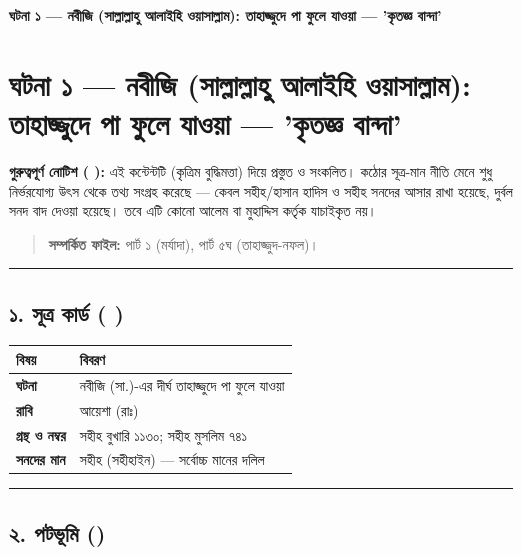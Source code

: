 

\begin{center}{\Large\bfseries\color{emerald} ঘটনা ১ — নবীজি (সাল্লাল্লাহু আলাইহি ওয়াসাল্লাম): তাহাজ্জুদে পা ফুলে যাওয়া — 'কৃতজ্ঞ বান্দা'}\end{center}
\vspace{1em}
\section*{ঘটনা ১ — নবীজি (সাল্লাল্লাহু আলাইহি ওয়াসাল্লাম): তাহাজ্জুদে পা ফুলে যাওয়া — 'কৃতজ্ঞ বান্দা'}

\begin{warnbox}
 \textbf{গুরুত্বপূর্ণ নোটিশ ( ):} এই কন্টেন্টটি  (কৃত্রিম বুদ্ধিমত্তা) দিয়ে প্রস্তুত ও সংকলিত।  কঠোর সূত্র-মান নীতি মেনে শুধু নির্ভরযোগ্য উৎস থেকে তথ্য সংগ্রহ করেছে — কেবল সহীহ/হাসান হাদিস ও সহীহ সনদের আসার রাখা হয়েছে, দুর্বল সনদ বাদ দেওয়া হয়েছে। তবে এটি কোনো আলেম বা মুহাদ্দিস কর্তৃক যাচাইকৃত নয়।
\end{warnbox}

\begin{quote}
\textbf{সম্পর্কিত ফাইল:} পার্ট ১ (মর্যাদা), পার্ট ৫ঘ (তাহাজ্জুদ-নফল)।
\end{quote}

\medskip\hrule\medskip

\subsection*{১. সূত্র কার্ড ( )}

\begin{table}[h]\centering\small
\begin{tabular}{ll}
বিষয় & বিবরণ \\
\hline
\textbf{ঘটনা} & নবীজি (সা.)-এর দীর্ঘ তাহাজ্জুদে পা ফুলে যাওয়া \\
\textbf{রাবি} & আয়েশা (রাঃ) \\
\textbf{গ্রন্থ ও নম্বর} & সহীহ বুখারি ১১৩০; সহীহ মুসলিম ৭৪১ \\
\textbf{সনদের মান} & সহীহ (সহীহাইন) — সর্বোচ্চ মানের দলিল \\
\hline
\end{tabular}
\end{table}

\medskip\hrule\medskip

\subsection*{২. পটভূমি ()}

